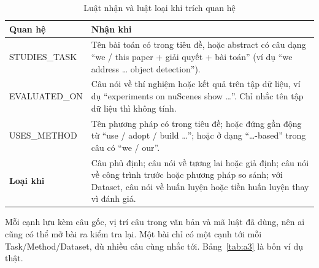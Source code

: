 \documentclass[11pt,a4paper]{article}
\begin{document}
\begin{table}[H]
\small\centering
\renewcommand{\arraystretch}{1.25}
\caption{Luật nhận và luật loại khi trích quan hệ}
\label{tab:luat}
\begin{tabularx}{\textwidth}{@{}>{\raggedright\arraybackslash}p{3.4cm} @{\hspace{0.4cm}} >{\raggedright\arraybackslash}X@{}}
\toprule
\textbf{Quan hệ} & \textbf{Nhận khi}\\
\midrule
STUDIES\_TASK & Tên bài toán có trong tiêu đề, hoặc abstract có câu dạng ``we / this paper + giải quyết + bài toán'' (ví dụ ``we address \ldots{} object detection'').\\
EVALUATED\_ON & Câu nói về thí nghiệm hoặc kết quả trên tập dữ liệu, ví dụ ``experiments on nuScenes show \ldots''. Chỉ nhắc tên tập dữ liệu thì không tính.\\
USES\_METHOD & Tên phương pháp có trong tiêu đề; hoặc đứng gần động từ ``use / adopt / build \ldots''; hoặc ở dạng ``\ldots-based'' trong câu có ``we / our''.\\
\midrule
\textbf{Loại khi} & Câu phủ định; câu nói về tương lai hoặc giả định; câu nói về công trình trước hoặc phương pháp so sánh; với Dataset, câu nói về huấn luyện hoặc tiền huấn luyện thay vì đánh giá.\\
\bottomrule
\end{tabularx}
\end{table}


Mỗi cạnh lưu kèm câu gốc, vị trí câu trong văn bản và mã luật đã dùng, nên ai cũng có thể mở bài ra kiểm tra lại. Một bài chỉ có một cạnh tới mỗi Task/Method/Dataset, dù nhiều câu cùng nhắc tới. Bảng~\ref{tab:a3} là bốn ví dụ thật.
\end{document}
